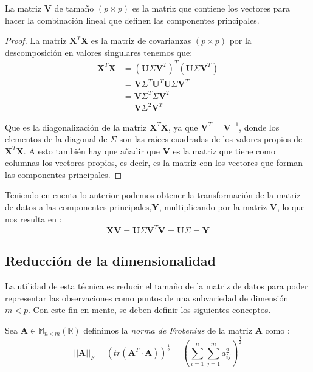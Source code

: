 \begin{propo}
La matriz \textbf{V} de tamaño $(p\times p)$ es la matriz que contiene los vectores para hacer la combinación lineal que definen las componentes principales.
\begin{proof}
La matriz $\textbf{X}^T \textbf{X}$ es la matriz de covarianzas $(p \times p)$  por la descomposición en valores singulares tenemos que:
\begin{align*}
\textbf{X}^T \textbf{X} &= (\textbf{U}\Sigma \textbf{V}^T)^T (\textbf{U}\Sigma \textbf{V}^T)\\
&= \textbf{V}\Sigma ^T \textbf{U}^T \textbf{U}\Sigma \textbf{V}^T\\
&= \textbf{V}\Sigma ^T \Sigma \textbf{V}^T \\
&=  \textbf{V}\Sigma ^2  \textbf{V}^T 
\end{align*}

\noindent Que es la diagonalización de la matriz $\textbf{X}^T \textbf{X}$, ya que $\textbf{V}^T=\textbf{V}^{-1}$, donde los elementos de la diagonal de $\Sigma$ son las raíces cuadradas de los valores propios de $\textbf{X}^T \textbf{X}$. A esto también hay que añadir que \textbf{V} es la matriz que tiene como columnas los vectores propios, es decir, es la matriz con los vectores que forman las componentes principales. 
\end{proof}
\end{propo}

\noindent Teniendo en cuenta lo anterior podemos obtener la transformación de la matriz de datos a las componentes principales,\textbf{Y}, multiplicando por la matriz $\textbf{V}$, lo que nos resulta en :
\begin{equation}
\textbf{XV}=\textbf{U}\Sigma \textbf{V}^T \textbf{V}=\textbf{U}\Sigma=\textbf{Y}
\end{equation}
\subsection{Reducción de la dimensionalidad}

\noindent La utilidad de esta técnica es reducir el tamaño de la matriz de datos para poder representar las observaciones como puntos de una subvariedad de dimensión $m < p$. Con este fin en mente, se deben definir los siguientes conceptos.
\begin{defi}
Sea $\textbf{A}\in \mathbb{M}_{n\times m}(\mathbb{R})$ definimos la \textit{norma de Frobenius} de la matriz \textbf{A} como :
\begin{equation}
||\textbf{A}||_F=(tr(\textbf{A}^T\cdot \textbf{A}))^{\frac{1}{2}}=\left(\sum_{i=1}^{n}\sum _{j=1}^{m}a_{ij}^2\right)^{\frac{1}{2}}
\end{equation}
\end{defi}

